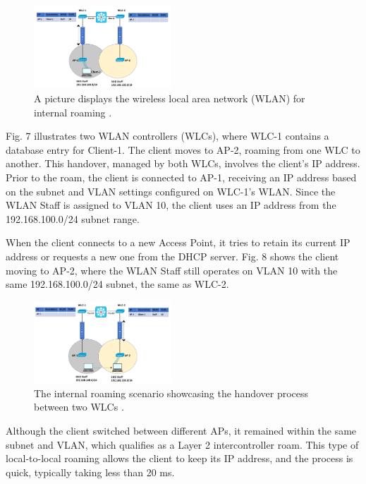 \documentclass[conference]{IEEEtran}
\begin{document}
\begin{figure}[htbp]
    \centering
    \includegraphics[width=0.46\textwidth]{fig7_internal_roaming.png}
    \caption{A picture displays the wireless local area network (WLAN) for internal roaming \cite{study_ccnp}.}
\end{figure}

Fig. 7 illustrates two WLAN controllers (WLCs), where WLC-1 contains a database entry for Client-1. The client moves to AP-2, roaming from one WLC to another. This handover, managed by both WLCs, involves the client’s IP address. Prior to the roam, the client is connected to AP-1, receiving an IP address based on the subnet and VLAN settings configured on WLC-1’s WLAN. Since the WLAN Staff is assigned to VLAN 10, the client uses an IP address from the 192.168.100.0/24 subnet range.

When the client connects to a new Access Point, it tries to retain its current IP address or requests a new one from the DHCP server. Fig. 8 shows the client moving to AP-2, where the WLAN Staff still operates on VLAN 10 with the same 192.168.100.0/24 subnet, the same as WLC-2.

\begin{figure}[htbp]
    \centering
    \includegraphics[width=0.46\textwidth]{fig8_internal_roaming_after_roaming.png}
    \caption{The internal roaming scenario showcasing the handover process between two WLCs \cite{study_ccnp}.}
\end{figure}

Although the client switched between different APs, it remained within the same subnet and VLAN, which qualifies as a Layer 2 intercontroller roam. This type of local-to-local roaming allows the client to keep its IP address, and the process is quick, typically taking less than 20 ms.
\end{document}
